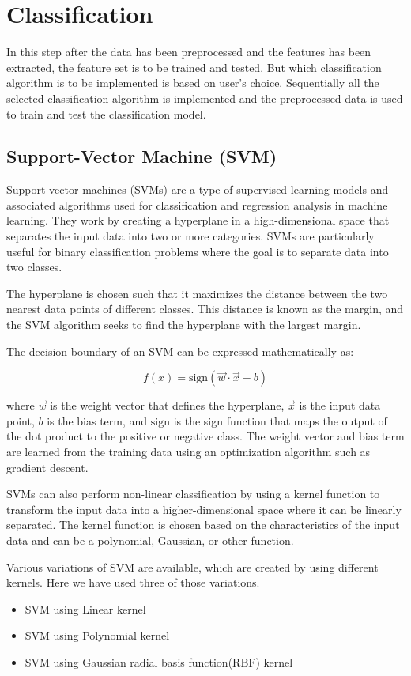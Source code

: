 \documentclass[12pt,a4paper]{report}
\begin{document}
\section{Classification}
\justify In this step after the data has been preprocessed and the features has been extracted, the feature set is to be trained and tested. But which classification algorithm is to be implemented is based on user's choice. Sequentially all the selected classification algorithm is implemented and the preprocessed data is used to train and test the classification model.

\subsection{Support-Vector Machine (SVM)}
\justify Support-vector machines (SVMs) are a type of supervised learning models and associated algorithms used for classification and regression analysis in machine learning. They work by creating a hyperplane in a high-dimensional space that separates the input data into two or more categories. SVMs are particularly useful for binary classification problems where the goal is to separate data into two classes.

The hyperplane is chosen such that it maximizes the distance between the two nearest data points of different classes. This distance is known as the margin, and the SVM algorithm seeks to find the hyperplane with the largest margin.

The decision boundary of an SVM can be expressed mathematically as:

\begin{equation}
	f(x) = \text{sign}(\vec{w} \cdot \vec{x} - b)
\end{equation}

where $\vec{w}$ is the weight vector that defines the hyperplane, $\vec{x}$ is the input data point, $b$ is the bias term, and $\text{sign}$ is the sign function that maps the output of the dot product to the positive or negative class. The weight vector and bias term are learned from the training data using an optimization algorithm such as gradient descent.

SVMs can also perform non-linear classification by using a kernel function to transform the input data into a higher-dimensional space where it can be linearly separated. The kernel function is chosen based on the characteristics of the input data and can be a polynomial, Gaussian, or other function.

\justify Various variations of SVM are available, which are created by using different kernels. Here we have used three of those variations.
\begin{itemize}
	\item SVM using Linear kernel
	\item SVM using Polynomial kernel
	\item SVM using Gaussian radial basis function(RBF) kernel
\end{itemize}
\end{document}
